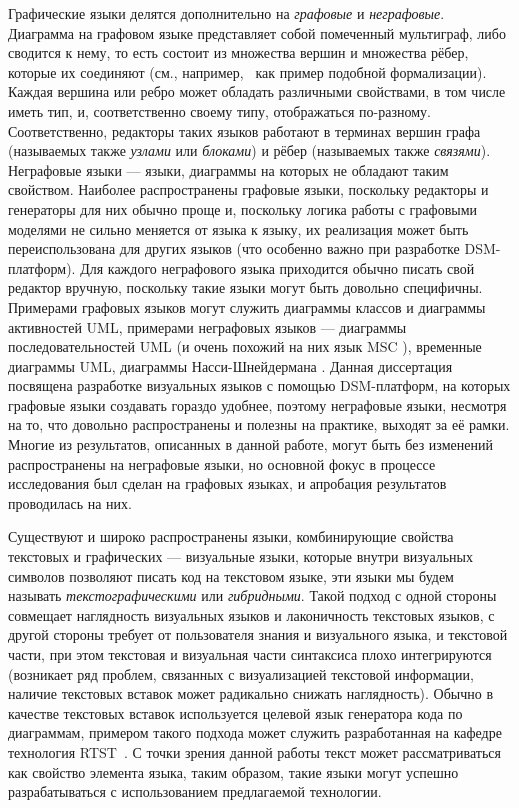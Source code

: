 Графические языки делятся дополнительно на \textit{графовые} и \textit{неграфовые}. Диаграмма на 
графовом языке представляет собой помеченный мультиграф, либо сводится к нему, то 
есть состоит из множества вершин и множества рёбер, которые их соединяют (см., например,~\cite{sukhov2013disser}
как пример подобной формализации). Каждая вершина или ребро может обладать различными свойствами, в том числе иметь 
тип, и, соответственно своему типу, отображаться по-разному. Соответственно,
 редакторы таких языков работают в терминах вершин графа (называемых также 
\textit{узлами} или \textit{блоками}) и рёбер (называемых также \textit{связями}). Неграфовые языки --- 
языки, диаграммы на которых не обладают таким свойством. Наиболее распространены 
графовые языки, поскольку редакторы и генераторы для них обычно проще и, 
поскольку логика работы с графовыми моделями не сильно меняется от языка к 
языку, их реализация может быть переиспользована для других языков (что особенно 
важно при разработке DSM-платформ). Для каждого неграфового языка приходится 
обычно писать свой редактор вручную, поскольку такие языки могут быть довольно 
специфичны. Примерами графовых языков могут служить диаграммы классов и 
диаграммы активностей \ac{UML}, примерами неграфовых языков --- диаграммы 
последовательностей \ac{UML} (и очень похожий на них язык MSC%
), временные диаграммы \ac{UML}, диаграммы Насси-Шнейдермана%
. Данная диссертация посвящена разработке визуальных языков с помощью 
DSM-платформ, на которых графовые языки создавать гораздо удобнее, поэтому 
неграфовые языки, несмотря на то, что довольно распространены и полезны на 
практике, выходят за её рамки. Многие из результатов, описанных в данной работе, могут 
быть без изменений распространены на неграфовые языки, но основной фокус в процессе 
исследования был сделан на графовых языках, и апробация результатов проводилась на них.

Существуют и широко распространены языки, комбинирующие свойства текстовых и 
графических --- визуальные языки, которые внутри визуальных символов позволяют 
писать код на текстовом языке, эти языки мы будем называть \textit{текстографическими} или \textit{гибридными}. 
Такой подход с одной стороны совмещает наглядность визуальных языков и лаконичность текстовых языков, с другой стороны 
требует от пользователя знания и визуального языка, и текстовой части, при этом 
текстовая и визуальная части синтаксиса плохо интегрируются (возникает ряд 
проблем, связанных с визуализацией текстовой информации, наличие текстовых
вставок может радикально снижать наглядность). Обычно в качестве текстовых 
вставок используется целевой язык генератора кода по диаграммам, примером такого 
подхода может служить разработанная на кафедре технология RTST~\cite{parfenov1997rtst, terekhov1998rtst}. 
С точки зрения данной работы текст может рассматриваться как свойство элемента 
языка, таким образом, такие языки могут успешно разрабатываться с использованием 
предлагаемой технологии.

